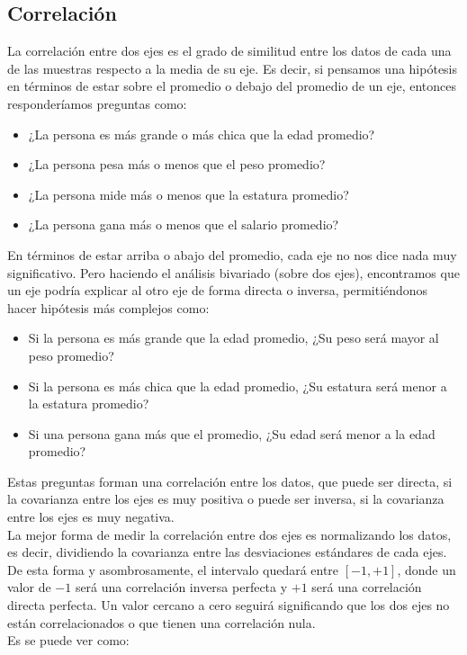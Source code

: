 \documentclass{article}
\begin{document}
\subsection{Correlación}

La correlación entre dos ejes es el grado de similitud entre los datos de cada una de las muestras respecto a la media de su eje. Es decir, si pensamos una hipótesis en términos de estar sobre el promedio o debajo del promedio de un eje, entonces responderíamos preguntas como:
\begin{itemize}
    \item ¿La persona es más grande o más chica que la edad promedio?
    \item ¿La persona pesa más o menos que el peso promedio?
    \item ¿La persona mide más o menos que la estatura promedio?
    \item ¿La persona gana más o menos que el salario promedio?
\end{itemize}
En términos de estar arriba o abajo del promedio, cada eje no nos dice nada muy significativo. Pero haciendo el análisis bivariado (sobre dos ejes), encontramos que un eje podría explicar al otro eje de forma directa o inversa, permitiéndonos hacer hipótesis más complejos como:
\begin{itemize}
    \item Si la persona es más grande que la edad promedio, ¿Su peso será mayor al peso promedio?
    \item Si la persona es más chica que la edad promedio, ¿Su estatura será menor a la estatura promedio?
    \item Si una persona gana más que el promedio, ¿Su edad será menor a la edad promedio?
\end{itemize}
Estas preguntas forman una correlación entre los datos, que puede ser directa, si la covarianza entre los ejes es muy positiva o puede ser inversa, si la covarianza entre los ejes es muy negativa.
\\[12pt]
La mejor forma de medir la correlación entre dos ejes es normalizando los datos, es decir, dividiendo la covarianza entre las desviaciones estándares de cada ejes. De esta forma y asombrosamente, el intervalo quedará entre $[-1, +1]$, donde un valor de $-1$ será una correlación inversa perfecta y $+1$ será una correlación directa perfecta. Un valor cercano a cero seguirá significando que los dos ejes no están correlacionados o que tienen una correlación nula.
\\[12pt]
Es se puede ver como:
\end{document}
